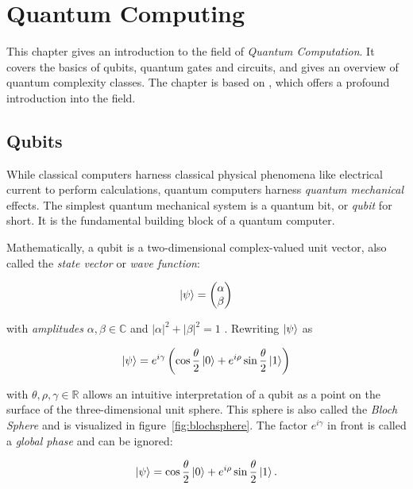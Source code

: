 \chapter{Quantum Computing}
\label{sec:quantum_computing}

This chapter gives an introduction to the field of \textit{Quantum Computation}. It covers the basics of qubits, quantum gates and circuits, and gives an overview of quantum complexity classes. The chapter is based on \cite{nielsen2002quantum}, which offers a profound introduction into the field.

\section{Qubits}
\label{sec:qubits}

While classical computers harness classical physical phenomena like electrical current to perform calculations, quantum computers harness 
\textit{quantum mechanical} effects. The simplest quantum mechanical system is a quantum bit, or
\textit{qubit} for short. It is the fundamental building block of a quantum computer.

Mathematically, a qubit is a two-dimensional complex-valued unit vector,
also called the \textit{state vector} or \textit{wave function}:

\begin{equation}
  \label{eq:qubit1}
  \Ket{\psi} = \begin{pmatrix} \alpha \\ \beta \end{pmatrix}
\end{equation}

with \textit{amplitudes} $\alpha, \beta \in \mathbb{C}$ and $|\alpha|^2 + |\beta| ^2 = 1$ . 
Rewriting $\Ket{\psi}$ as

\begin{equation}
  \Ket{\psi} = e^{i \gamma} \left( \cos{\frac{\theta}{2}} \Ket{0} + e^{i \rho} \sin{\frac{\theta}{2}} \Ket{1} \right)
\end{equation}

with $\theta, \rho, \gamma \in \mathbb{R}$
allows an intuitive interpretation of a qubit as a point on the surface of the three-dimensional unit sphere.
This sphere is also called the \textit{Bloch Sphere} and is visualized in figure~\ref{fig:blochsphere}. The factor $e^{i \gamma}$ in front is called a
\textit{global phase} and can be ignored:

\begin{equation}
  \Ket{\psi} = \cos{\frac{\theta}{2}} \Ket{0} + e^{i \rho} \sin{\frac{\theta}{2}} \Ket{1}.
\end{equation}

